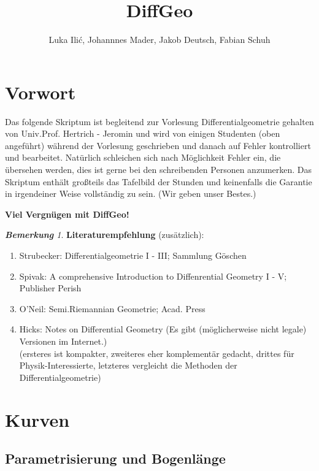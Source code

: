 \documentclass[a4paper,oneside,11pt,DIV=12,parskip=half]{scrartcl}
\title{DiffGeo}
\author{ Luka Ili\'{c}, Johannnes Mader, Jakob Deutsch, Fabian Schuh}
\theoremstyle{plain}
\theoremstyle{definition}
\newtheorem{remark, definition}[theorem]{Bemerkung und Definition.}
\newtheorem{lemma, definition}[theorem]{Lemma und Definition.}
\theoremstyle{remark}
\newtheorem*{remark}{\textbf{Bemerkung}}
\newtheorem*{remark, example}{\textbf{Bemerkung und Beispiel}}
\begin{document}
	
	\maketitle
	
	\pagebreak
	
	\tableofcontents
	
	\pagebreak
	
\section*{Vorwort} 
Das folgende Skriptum ist begleitend zur Vorlesung Differentialgeometrie gehalten von Univ.Prof. Hertrich - Jeromin und wird von einigen Studenten (oben angeführt) während der Vorlesung geschrieben und danach auf Fehler kontrolliert und bearbeitet. Natürlich schleichen sich nach Möglichkeit Fehler ein, die übersehen werden, dies ist gerne bei den schreibenden Personen anzumerken.
Das Skriptum enthält großteils das Tafelbild der Stunden und keinenfalls die Garantie in irgendeiner Weise vollständig zu sein. (Wir geben unser Bestes.)

\textbf{Viel Vergnügen mit DiffGeo!}

\begin{remark}
	\textbf{Literaturempfehlung} (zusätzlich): \begin{enumerate}
		\item Strubecker: Differentialgeometrie I - III; Sammlung Göschen
		\item Spivak: A comprehensive Introduction to Diffenrential Geometry I - V; Publisher Perish
		\item O'Neil: Semi.Riemannian Geometrie; Acad. Press
		\item Hicks: Notes on Differential Geometry (Es gibt (möglicherweise nicht legale) Versionen im Internet.)\\
		(ersteres ist kompakter, zweiteres eher komplementär gedacht, drittes für Physik-Interessierte, letzteres vergleicht die Methoden der Differentialgeometrie)
	\end{enumerate}
\end{remark}
\pagebreak
	
\section{Kurven}
\subsection{Parametrisierung und Bogenlänge}
\end{document}
